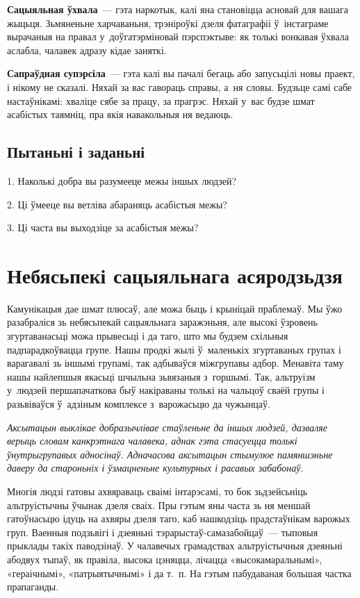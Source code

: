 \textbf{Сацыяльная ўхвала}~--- гэта наркотык, калі яна становіцца асновай для вашага жыцьця. Зьмяненьне харчаваньня, трэніроўкі дзеля фатаграфіі ў~інстаграме вырачаныя на правал у~доўгатэрміновай пэрспэктыве: як толькі вонкавая ўхвала аслабла, чалавек адразу кідае заняткі. 

\textbf{Сапраўдная супэрсіла}~--- гэта калі вы пачалі бегаць або запусьцілі новы праект, і нікому не сказалі. Няхай за вас гавораць справы, а~ня словы. Будзьце самі сабе настаўнікамі: хваліце сябе за працу, за прагрэс. Няхай у~вас будзе шмат асабістых таямніц, пра якія навакольныя ня ведаюць. 

\subsection*{Пытаньні і заданьні}

1. Наколькі добра вы разумееце межы іншых людзей?

2. Ці ўмееце вы ветліва абараняць асабістыя межы?

3. Ці часта вы выходзіце за асабістыя межы?


\section{Небясьпекі сацыяльнага асяродзьдзя}

Камунікацыя дае шмат плюсаў, але можа быць і крыніцай праблемаў. Мы ўжо разабраліся зь небясьпекай сацыяльнага заражэньня, але высокі ўзровень згуртаванасьці можа прывесьці і да таго, што мы будзем схільныя падпарадкоўвацца групе. Нашы продкі жылі ў~маленькіх згуртаваных групах і варагавалі зь іншымі групамі, так адбываўся міжгрупавы адбор. Менавіта таму нашы найлепшыя якасьці шчыльна зьвязаныя з~горшымі. Так, альтруізм у~людзей першапачаткова быў накіраваны толькі на чальцоў сваёй групы і разьвіваўся ў~адзіным комплексе з~варожасьцю да чужынцаў. 

\emph{Аксытацын выклікае добразычлівае стаўленьне да іншых людзей, дазваляе верыць словам канкрэтнага чалавека, аднак гэта стасуецца толькі ўнутрыгрупавых адносінаў. Адначасова аксытацын стымулюе памяншэньне даверу да староньніх і ўзмацненьне культурных і расавых забабонаў.}

Многія людзі гатовы ахвяраваць сваімі інтарэсамі, то бок зьдзейсьніць альтруістычны ўчынак дзеля сваіх. Пры гэтым яны часта зь ня меншай гатоўнасьцю ідуць на ахвяры дзеля таго, каб нашкодзіць прадстаўнікам варожых груп. Ваенныя подзьвігі і дзеяньні тэрарыстаў-самазабойцаў~--- тыповыя прыклады такіх паводзінаў. У чалавечых грамадствах альтруістычныя дзеяньні абодвух тыпаў, як правіла, высока цэняцца, лічацца «высокамаральнымі», «гераічнымі», «патрыятычнымі» і да т.~п. На гэтым пабудаваная большая частка прапаганды.

